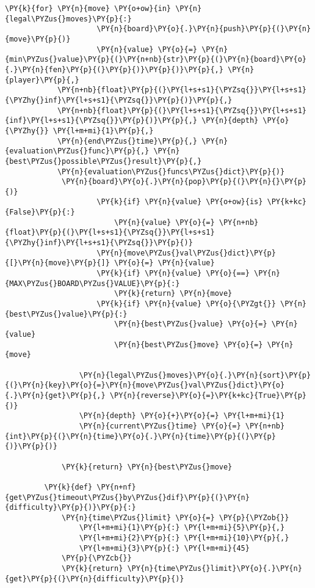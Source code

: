 \begin{Verbatim}[commandchars=\\\{\}]
                 \PY{k}{for} \PY{n}{move} \PY{o+ow}{in} \PY{n}{legal\PYZus{}moves}\PY{p}{:}
                     \PY{n}{board}\PY{o}{.}\PY{n}{push}\PY{p}{(}\PY{n}{move}\PY{p}{)}
                     \PY{n}{value} \PY{o}{=} \PY{n}{min\PYZus{}value}\PY{p}{(}\PY{n+nb}{str}\PY{p}{(}\PY{n}{board}\PY{o}{.}\PY{n}{fen}\PY{p}{(}\PY{p}{)}\PY{p}{)}\PY{p}{,} \PY{n}{player}\PY{p}{,} 
			\PY{n+nb}{float}\PY{p}{(}\PY{l+s+s1}{\PYZsq{}}\PY{l+s+s1}{\PYZhy{}inf}\PY{l+s+s1}{\PYZsq{}}\PY{p}{)}\PY{p}{,} 
			\PY{n+nb}{float}\PY{p}{(}\PY{l+s+s1}{\PYZsq{}}\PY{l+s+s1}{inf}\PY{l+s+s1}{\PYZsq{}}\PY{p}{)}\PY{p}{,} \PY{n}{depth} \PY{o}{\PYZhy{}} \PY{l+m+mi}{1}\PY{p}{,} 
			\PY{n}{end\PYZus{}time}\PY{p}{,} \PY{n}{evaluation\PYZus{}func}\PY{p}{,} \PY{n}{best\PYZus{}possible\PYZus{}result}\PY{p}{,} 
			\PY{n}{evaluation\PYZus{}funcs\PYZus{}dict}\PY{p}{)}
		     \PY{n}{board}\PY{o}{.}\PY{n}{pop}\PY{p}{(}\PY{n}{}\PY{p}{)}
                     \PY{k}{if} \PY{n}{value} \PY{o+ow}{is} \PY{k+kc}{False}\PY{p}{:}
                         \PY{n}{value} \PY{o}{=} \PY{n+nb}{float}\PY{p}{(}\PY{l+s+s1}{\PYZsq{}}\PY{l+s+s1}{\PYZhy{}inf}\PY{l+s+s1}{\PYZsq{}}\PY{p}{)}
                     \PY{n}{move\PYZus{}val\PYZus{}dict}\PY{p}{[}\PY{n}{move}\PY{p}{]} \PY{o}{=} \PY{n}{value}
                     \PY{k}{if} \PY{n}{value} \PY{o}{==} \PY{n}{MAX\PYZus{}BOARD\PYZus{}VALUE}\PY{p}{:}
                         \PY{k}{return} \PY{n}{move}
                     \PY{k}{if} \PY{n}{value} \PY{o}{\PYZgt{}} \PY{n}{best\PYZus{}value}\PY{p}{:}
                         \PY{n}{best\PYZus{}value} \PY{o}{=} \PY{n}{value}
                         \PY{n}{best\PYZus{}move} \PY{o}{=} \PY{n}{move}
         
                 \PY{n}{legal\PYZus{}moves}\PY{o}{.}\PY{n}{sort}\PY{p}{(}\PY{n}{key}\PY{o}{=}\PY{n}{move\PYZus{}val\PYZus{}dict}\PY{o}{.}\PY{n}{get}\PY{p}{,} \PY{n}{reverse}\PY{o}{=}\PY{k+kc}{True}\PY{p}{)}
                 \PY{n}{depth} \PY{o}{+}\PY{o}{=} \PY{l+m+mi}{1}
                 \PY{n}{current\PYZus{}time} \PY{o}{=} \PY{n+nb}{int}\PY{p}{(}\PY{n}{time}\PY{o}{.}\PY{n}{time}\PY{p}{(}\PY{p}{)}\PY{p}{)}
         
             \PY{k}{return} \PY{n}{best\PYZus{}move}
         
         \PY{k}{def} \PY{n+nf}{get\PYZus{}timeout\PYZus{}by\PYZus{}dif}\PY{p}{(}\PY{n}{difficulty}\PY{p}{)}\PY{p}{:}
             \PY{n}{time\PYZus{}limit} \PY{o}{=} \PY{p}{\PYZob{}}
                 \PY{l+m+mi}{1}\PY{p}{:} \PY{l+m+mi}{5}\PY{p}{,}
                 \PY{l+m+mi}{2}\PY{p}{:} \PY{l+m+mi}{10}\PY{p}{,}
                 \PY{l+m+mi}{3}\PY{p}{:} \PY{l+m+mi}{45}
             \PY{p}{\PYZcb{}}
             \PY{k}{return} \PY{n}{time\PYZus{}limit}\PY{o}{.}\PY{n}{get}\PY{p}{(}\PY{n}{difficulty}\PY{p}{)}
\end{Verbatim}

